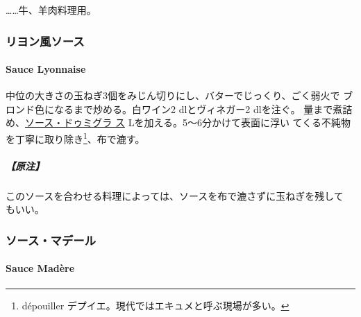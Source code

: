 \begin{recette}
\ldots{}\ldots{}牛、羊肉料理用。

\maeaki

\hypertarget{ux30eaux30e8ux30f3ux98a8ux30bdux30fcux30b9}{%
\subsubsection{リヨン風ソース}\label{ux30eaux30e8ux30f3ux98a8ux30bdux30fcux30b9}}

\hypertarget{sauce-lyonnaise}{%
\paragraph{Sauce Lyonnaise}\label{sauce-lyonnaise}}


中位の大きさの玉ねぎ3個をみじん切りにし、バターでじっくり、ごく弱火で
ブロンド色になるまで炒める。白ワイン2 dlとヴィネガー2 dlを注ぐ。
\untiers{}量まで煮詰め、\protect\hyperlink{sauce-demi-glace}{ソース・ドゥミグラ
ス}\troisquarts{} Lを加える。5〜6分かけて表面に浮い
てくる不純物を丁寧に取り除き\footnote{dépouiller
  デプイエ。現代ではエキュメと呼ぶ現場が多い。}、布で漉す。

\hypertarget{ux539fux6ce8-5}{%
\subparagraph{【原注】}\label{ux539fux6ce8-5}}

このソースを合わせる料理によっては、ソースを布で漉さずに玉ねぎを残して
もいい。

\maeaki

\hypertarget{ux30bdux30fcux30b9ux30deux30c7ux30fcux30eb}{%
\subsubsection{ソース・マデール}\label{ux30bdux30fcux30b9ux30deux30c7ux30fcux30eb}}

\hypertarget{sauce-madere}{%
\paragraph{Sauce Madère}\label{sauce-madere}}



\end{recette}
